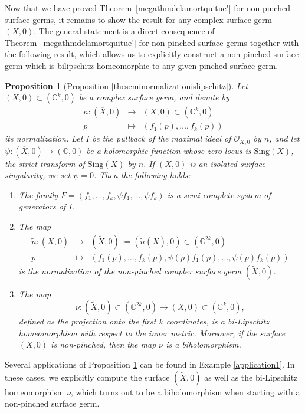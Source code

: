 \documentclass[reqno,dvipsnames,12pt]{amsart}
\newtheorem{proposition}[theorem]{Proposition}
\begin{document}
Now that we have proved Theorem~\ref{megathmdelamortquitue'} for non-pinched surface germs, it remains to show the result for any complex surface germ $(X,0)$. The general statement is a direct consequence of Theorem~\ref{megathmdelamortquitue'} for non-pinched surface germs together with the following result, which allows us to explicitly construct a non-pinched surface germ which is bilipschitz homeomorphic to any given pinched surface germ. \begin{proposition}[Proposition \ref{theseminormalizationislipschitz}]\label{propositionC}
Let $(X,0)\subset (\mathbb{C}^k,0)$ be a complex surface germ, and denote by
\[
\begin{array}{ccc}
n : (\overline{X},0) & \longrightarrow & (X,0)\subset(\mathbb{C}^k,0) \\
p & \longmapsto & (f_1(p),\ldots,f_k(p))
\end{array}
\]
its normalization. Let $I$ be the pullback of the maximal ideal of $\mathcal{O}_{X,0}$ by $n$, and let $\psi : (\overline{X},0) \longrightarrow (\mathbb{C},0)$
be a holomorphic function  whose zero locus is $\overline{\mathrm{Sing}(X)}$, the strict transform of $\mathrm{Sing}(X)$ by $n$. If $(X,0)$ is an isolated surface singularity, we set $\psi = 0$. Then the following holds:

\begin{enumerate}
\item \label{pointA} The family $F=(f_1,\ldots,f_k, \psi f_1, \ldots, \psi f_k)$ is a semi-complete system of generators of $I$. 

\item \label{pointB} The map
$$
\begin{array}{ccc}
\widetilde{n} : (\overline{X},0) & \longrightarrow & (\widetilde{X},0):=(\widetilde{n}(\overline{X}),0)\subset(\mathbb{C}^{2k},0) \\
p & \longmapsto & (f_1(p),\ldots,f_k(p), \psi(p)f_1(p), \dots, \psi(p)f_k(p))
\end{array}
$$
is the normalization of the non-pinched complex surface germ $(\widetilde{X},0)$.

\item \label{pointC} The map
\[
\nu : (\widetilde{X},0)\subset(\mathbb{C}^{2k},0) \longrightarrow (X,0) \subset(\mathbb{C}^{k},0),
\]
defined as the projection onto the first $k$ coordinates, is a bi-Lipschitz homeomorphism with respect to the inner metric. Moreover, if the surface $(X,0)$ is non-pinched, then the map $\nu$ is a biholomorphism.
\end{enumerate}
\end{proposition}
Several applications of Proposition \ref{propositionC} can be found in Example \ref{application1}. In these cases, we explicitly compute the surface $(\widetilde{X},0)$ as well as the bi-Lipschitz homeomorphism $\nu$, which turns out to be a biholomorphism when starting with a non-pinched surface germ.
\end{document}
